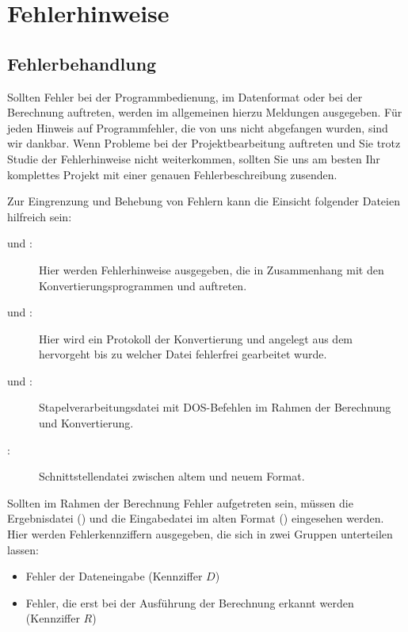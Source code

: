 \cleardoublepage


\chapter{Fehlerhinweise}


\section{Fehlerbehandlung}

Sollten Fehler bei der Programmbedienung, im Datenformat oder bei der Berechnung auftreten, werden im allgemeinen hierzu
Meldungen ausgegeben.
F\"{u}r jeden Hinweis auf Programmfehler, die von uns nicht abgefangen wurden, sind wir dankbar. Wenn Probleme bei der
Projektbearbeitung auftreten und Sie trotz Studie der Fehlerhinweise nicht weiterkommen, sollten Sie uns am besten Ihr
komplettes Projekt mit einer genauen Fehlerbeschreibung zusenden.

Zur Eingrenzung und Behebung von Fehlern kann die Einsicht folgender Dateien hilfreich sein:
\begin{description}
   \item[ und :] Hier werden Fehlerhinweise ausgegeben, die in Zusammenhang mit den
      Konvertierungsprogrammen  und  auftreten.
   \item[ und :] Hier wird ein Protokoll der Konvertierung  und
       angelegt aus dem hervorgeht bis zu welcher Datei fehlerfrei gearbeitet wurde.
   \item[ und :] Stapelverarbeitungsdatei mit DOS-Befehlen im Rahmen der Berechnung und
      Konvertierung.
   \item[:] Schnittstellendatei zwischen altem und neuem Format.
\end{description}
Sollten im Rahmen der Berechnung Fehler aufgetreten sein, m\"{u}ssen die Ergebnisdatei () und die Eingabedatei
im alten Format () eingesehen werden. Hier werden Fehlerkennziffern ausgegeben, die sich in zwei Gruppen
unterteilen lassen:
\begin{itemize}
   \item Fehler der Dateneingabe (Kennziffer $D$)
   \item Fehler, die erst bei der Ausf\"{u}hrung der Berechnung erkannt werden (Kennziffer $R$)
\end{itemize}


